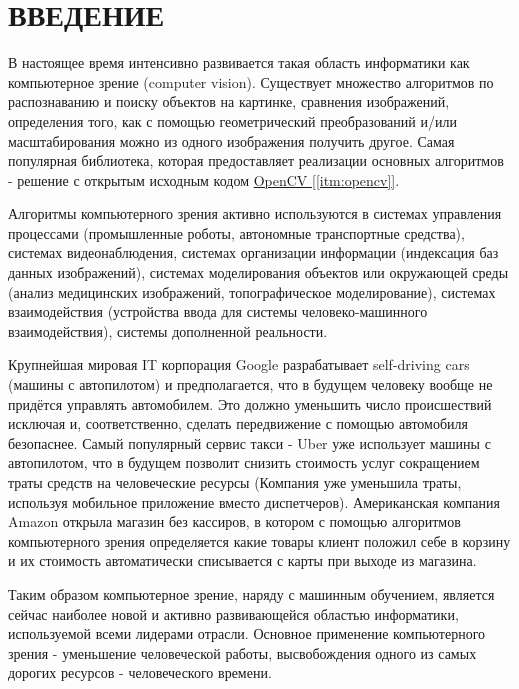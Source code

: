 \chapter*{ВВЕДЕНИЕ}

В настоящее время интенсивно развивается такая область информатики как компьютерное зрение (computer vision). Существует множество алгоритмов по распознаванию и поиску объектов на картинке, сравнения изображений, определения того, как с помощью геометрический преобразований и/или масштабирования можно из одного изображения получить другое. Самая популярная библиотека, которая предоставляет реализации основных алгоритмов - решение с открытым исходным кодом \hyperref[itm:opencv]{OpenCV [\ref{itm:opencv}]}.

Алгоритмы компьютерного зрения активно используются в системах управления процессами (промышленные роботы, автономные транспортные средства), системах видеонаблюдения, системах организации информации (индексация баз данных изображений), системах моделирования объектов или окружающей среды (анализ медицинских изображений, топографическое моделирование), системах взаимодействия (устройства ввода для системы человеко-машинного взаимодействия), системы дополненной реальности.

Крупнейшая мировая IT корпорация Google разрабатывает self-driving cars (машины с автопилотом) и предполагается, что в будущем человеку вообще не придётся управлять автомобилем. Это должно уменьшить число происшествий исключая  и, соответственно, сделать передвижение с помощью автомобиля безопаснее. Самый популярный сервис такси - Uber уже использует машины с автопилотом, что в будущем позволит снизить стоимость услуг сокращением траты средств на человеческие ресурсы (Компания уже уменьшила траты, используя мобильное приложение вместо диспетчеров). Американская компания Amazon открыла магазин без кассиров, в котором с помощью алгоритмов компьютерного зрения определяется какие товары клиент положил себе в корзину и их стоимость автоматически списывается с карты при выходе из магазина.

Таким образом компьютерное зрение, наряду с машинным обучением, является сейчас наиболее новой и активно развивающейся областью информатики, используемой всеми лидерами отрасли. Основное применение компьютерного зрения - уменьшение человеческой работы, высвобождения одного из самых дорогих ресурсов - человеческого времени.

\newpage